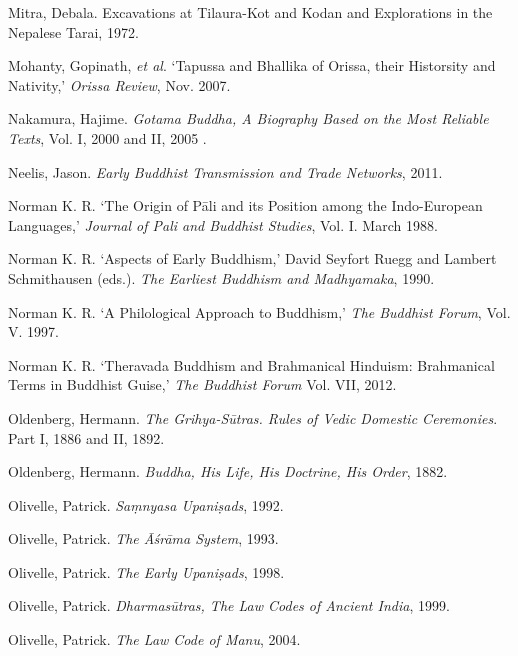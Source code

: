 \label{footprints_split_022.html_Mitraux201972}
Mitra, Debala. Excavations at Tilaura-Kot and Kodan and Explorations in
the Nepalese Tarai, 1972.

Mohanty, Gopinath, \emph{et al}. `Tapussa and Bhallika of Orissa, their
Historsity and Nativity,' \emph{Orissa Review}, Nov. 2007.

Nakamura, Hajime. \emph{Gotama Buddha, A Biography Based on the Most
Reliable Texts}, Vol. I, 2000 and II, 2005 .

Neelis, Jason. \emph{Early Buddhist Transmission and Trade Networks},
2011.

Norman K. R. `The Origin of Pāli and its Position among the
Indo-European Languages,' \emph{Journal of Pali and Buddhist Studies},
Vol. I. March 1988.

\label{footprints_split_022.html_Normanux201990}
Norman K. R. `Aspects of Early Buddhism,' David Seyfort Ruegg and
Lambert Schmithausen (eds.). \emph{The Earliest Buddhism and
Madhyamaka}, 1990.

\label{footprints_split_022.html_Normanux201997}
Norman K. R. `A Philological Approach to Buddhism,' \emph{The Buddhist
Forum}, Vol. V. 1997.

Norman K. R. `Theravada Buddhism and Brahmanical Hinduism: Brahmanical
Terms in Buddhist Guise,' \emph{The Buddhist Forum} Vol. VII, 2012.

\label{footprints_split_022.html_Oldenbergux201886-1892}
Oldenberg, Hermann. \emph{The Grihya-Sūtras. Rules of Vedic Domestic
Ceremonies}. Part I, 1886 and II, 1892.

Oldenberg, Hermann. \emph{Buddha, His Life, His Doctrine, His Order},
1882.

\label{footprints_split_022.html_Olivelleux201992}
Olivelle, Patrick. \emph{Saṃnyasa Upaniṣads}, 1992.

\label{footprints_split_022.html_Olivelleux201993}
Olivelle, Patrick. \emph{The Āśrāma System}, 1993.

\label{footprints_split_022.html_Olivelleux201998}
Olivelle, Patrick. \emph{The Early Upaniṣads}, 1998.

\label{footprints_split_022.html_Olivelleux201999}
Olivelle, Patrick. \emph{Dharmasūtras, The Law Codes of Ancient India},
1999.

\label{footprints_split_022.html_Olivelleux202004}
Olivelle, Patrick. \emph{The Law Code of Manu}, 2004.

